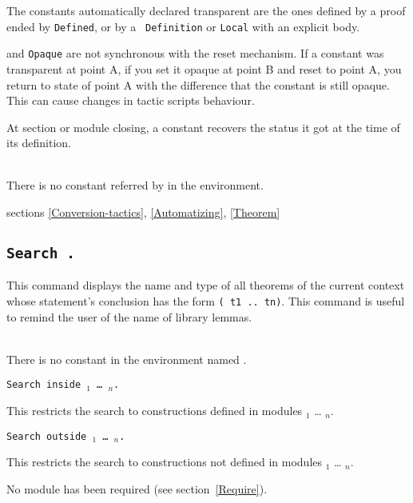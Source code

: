 The constants automatically declared transparent are the ones defined by a proof ended by {\tt Defined}, or by a {\tt
  Definition} or {\tt Local} with an explicit body.

 and \texttt{Opaque} are not synchronous
with the reset mechanism. If a constant was transparent at point A, if
you set it opaque at point B and reset to point A, you return to state
of point A with the difference that the constant is still opaque. This
can cause changes in tactic scripts behaviour.

At section or module closing, a constant recovers the status it got at
the time of its definition.


\begin{ErrMsgs}
\item {}\\
    There is no constant referred by {\qualid} in the environment.
\end{ErrMsgs}

\SeeAlso sections \ref{Conversion-tactics}, \ref{Automatizing},
\ref{Theorem}

\subsection{\tt Search {\qualid}.}
This command displays the name and type of all theorems of the current
context whose statement's conclusion has the form {\tt ({\qualid} t1 ..
  tn)}.  This command is useful to remind the user of the name of
library lemmas.
\begin{ErrMsgs}
\item {}\\
    There is no constant in the environment named \qualid.
\end{ErrMsgs}

\begin{Variants}
\item
{\tt Search {\qualid} inside {\module$_1$} \ldots{} {\module$_n$}.}

This restricts the search to constructions defined in modules
{\module$_1$} \ldots{} {\module$_n$}.

\item {\tt Search {\qualid} outside {\module$_1$} \ldots{} {\module$_n$}.}

This restricts the search to constructions not defined in modules
{\module$_1$} \ldots{} {\module$_n$}.

\begin{ErrMsgs}
\item {}
No module \module{} has been required (see section~\ref{Require}).
\end{ErrMsgs}

\end{Variants}

